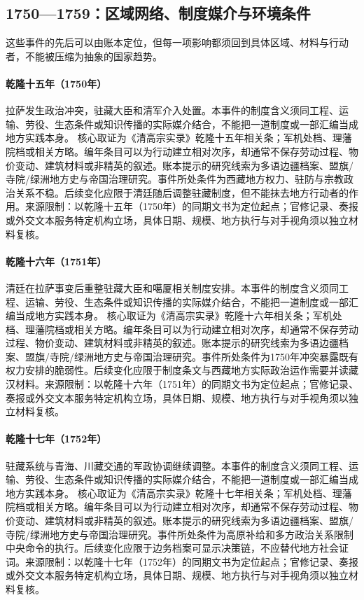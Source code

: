 \subsection{1750—1759：区域网络、制度媒介与环境条件}
这些事件的先后可以由账本定位，但每一项影响都须回到具体区域、材料与行动者，不能被压缩为抽象的国家趋势。
\hypertarget{civic:EQ-1750-LHASA-UPRISING}{}\paragraph{乾隆十五年（1750年）}拉萨发生政治冲突，驻藏大臣和清军介入处置。本事件的制度含义须同工程、运输、劳役、生态条件或知识传播的实际媒介结合，不能把一道制度或一部汇编当成地方实践本身。 核心取证为《清高宗实录》乾隆十五年相关条；军机处档、理藩院档或相关方略。编年条目可以为行动建立相对次序，却通常不保存劳动过程、物价变动、建筑材料或非精英的叙述。账本提示的研究线索为多语边疆档案、盟旗/寺院/绿洲地方史与帝国治理研究。事件所处条件为西藏地方权力、驻防与宗教政治关系不稳。后续变化应限于清廷随后调整驻藏制度，但不能抹去地方行动者的作用。来源限制：以乾隆十五年（1750年）的同期文书为定位起点；官修记录、奏报或外交文本服务特定机构立场，具体日期、规模、地方执行与对手视角须以独立材料复核。
\hypertarget{civic:EQ-1751-TIBET-ORDINANCE}{}\paragraph{乾隆十六年（1751年）}清廷在拉萨事变后重整驻藏大臣和噶厦相关制度安排。本事件的制度含义须同工程、运输、劳役、生态条件或知识传播的实际媒介结合，不能把一道制度或一部汇编当成地方实践本身。 核心取证为《清高宗实录》乾隆十六年相关条；军机处档、理藩院档或相关方略。编年条目可以为行动建立相对次序，却通常不保存劳动过程、物价变动、建筑材料或非精英的叙述。账本提示的研究线索为多语边疆档案、盟旗/寺院/绿洲地方史与帝国治理研究。事件所处条件为1750年冲突暴露既有权力安排的脆弱性。后续变化应限于制度条文与西藏地方实际政治运作需要并读藏汉材料。来源限制：以乾隆十六年（1751年）的同期文书为定位起点；官修记录、奏报或外交文本服务特定机构立场，具体日期、规模、地方执行与对手视角须以独立材料复核。
\hypertarget{civic:EQ-1752-TIBETAN-ADMINISTRATION}{}\paragraph{乾隆十七年（1752年）}驻藏系统与青海、川藏交通的军政协调继续调整。本事件的制度含义须同工程、运输、劳役、生态条件或知识传播的实际媒介结合，不能把一道制度或一部汇编当成地方实践本身。 核心取证为《清高宗实录》乾隆十七年相关条；军机处档、理藩院档或相关方略。编年条目可以为行动建立相对次序，却通常不保存劳动过程、物价变动、建筑材料或非精英的叙述。账本提示的研究线索为多语边疆档案、盟旗/寺院/绿洲地方史与帝国治理研究。事件所处条件为高原补给和多方政治关系限制中央命令的执行。后续变化应限于边务档案可显示决策链，不应替代地方社会证词。来源限制：以乾隆十七年（1752年）的同期文书为定位起点；官修记录、奏报或外交文本服务特定机构立场，具体日期、规模、地方执行与对手视角须以独立材料复核。
